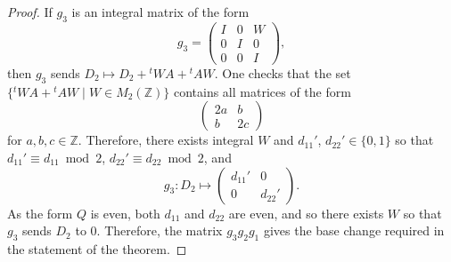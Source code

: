 \documentclass[11pt]{amsart}
\newcommand{\ZZ}{\mathbb{Z}}
\begin{document}
\begin{proof}
If $g_3$ is an integral matrix of the form
\begin{equation*}
g_3= 
\begin{pmatrix} 
I & 0 & W \\
0 & I & 0 \\ 
0 & 0 & I 
\end{pmatrix},
\end{equation*}
then $g_3$ sends $D_2 \mapsto D_2 + {}^tW A + {}^tAW$. 
One checks that the set $\{ {}^tWA + {}^tAW \mid W \in M_2(\ZZ) \}$ contains all matrices of the form 
\begin{equation*}
\begin{pmatrix} 
2a & b \\ 
b & 2c 
\end{pmatrix}
\end{equation*}
for $a,b,c \in \ZZ$. 
Therefore, there exists integral $W$ and $d_{11}'$, $d_{22}' \in \{0,1\}$ so that $d_{11}' \equiv d_{11} \bmod{2}$, $d_{22}' \equiv d_{22} \bmod{2}$, and 
\begin{equation*}
g_3: D_2 
\mapsto
\begin{pmatrix}
d_{11}' & 0 \\
0 & d_{22}' 
\end{pmatrix}.
\end{equation*}
As the form $Q$ is even, both $d_{11}$ and $d_{22}$ are even, and so there exists $W$ so that $g_3$ sends $D_2$ to $0$.
Therefore, the matrix $g_3 g_2 g_1$ gives the base change required in the statement of the theorem.


\end{proof}
\end{document}
